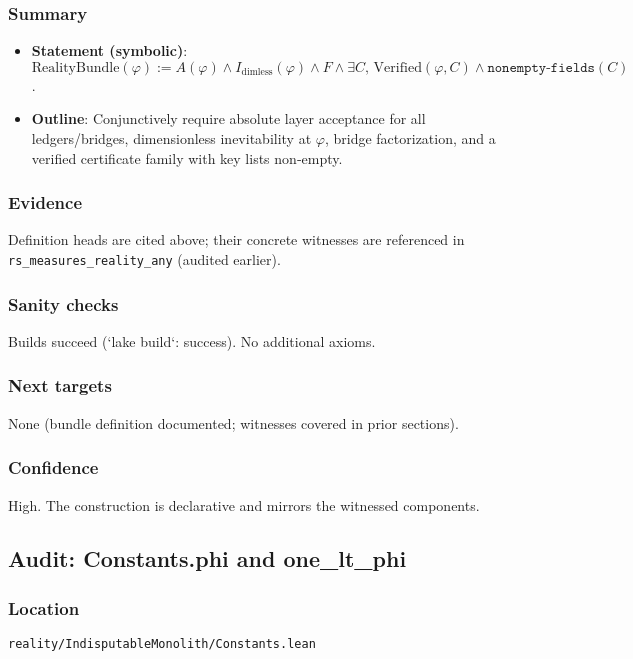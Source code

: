 \documentclass{article}
\newcommand{\FileRef}[1]{\texttt{#1}}
\begin{document}
\subsubsection{Summary}
\begin{itemize}[leftmargin=*]
  \item \textbf{Statement (symbolic)}: \(\mathrm{RealityBundle}(\varphi) := A(\varphi) \land I_\mathrm{dimless}(\varphi) \land F \land \exists C,\, \mathrm{Verified}(\varphi,C) \land \texttt{nonempty‑fields}(C)\).
  \item \textbf{Outline}: Conjunctively require absolute layer acceptance for all ledgers/bridges, dimensionless inevitability at \(\varphi\), bridge factorization, and a verified certificate family with key lists non‑empty.
\end{itemize}

\subsubsection{Evidence}
Definition heads are cited above; their concrete witnesses are referenced in \texttt{rs\_measures\_reality\_any} (audited earlier).

\subsubsection{Sanity checks}
Builds succeed (`lake build`: success). No additional axioms.

\subsubsection{Next targets}
None (bundle definition documented; witnesses covered in prior sections).

\subsubsection{Confidence}
High. The construction is declarative and mirrors the witnessed components.

\subsection{Audit: Constants.phi and one\_lt\_phi}
\subsubsection{Location}
\FileRef{reality/IndisputableMonolith/Constants.lean}
\end{document}
